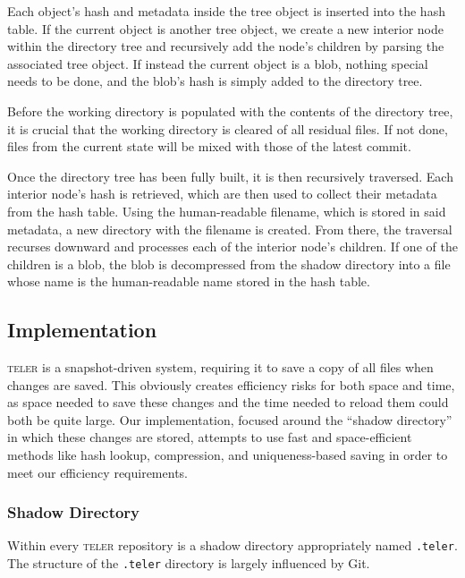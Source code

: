 \documentclass[12pt, letterpaper]{article}
\begin{document}
\begin{multicols}{2}
  Each object's hash and metadata inside the tree object is inserted
  into the hash table. If the current object is another tree object, we
  create a new interior node within the directory tree and recursively
  add the node's children by parsing the associated tree object. If
  instead the current object is a blob, nothing special needs to
  be done, and the blob's hash is simply added to the directory tree.

  Before the working directory is populated with the contents of the
  directory tree, it is crucial that the working directory is cleared
  of all residual files. If not done, files from the current state
  will be mixed with those of the latest commit.

  Once the directory tree has been fully built, it is then recursively
  traversed. Each interior node's hash is retrieved, which are
  then used to collect their metadata from the hash table. Using the
  human-readable filename, which is stored in said metadata, a new
  directory with the filename is created. From there, the traversal
  recurses downward and processes each of the interior node's
  children. If one of the children is a blob, the blob is decompressed
  from the shadow directory into a file whose name is the
  human-readable name stored in the hash table.

  \subsection{Implementation}
  \label{sec:implementation}
  \textsc{teler} is a snapshot-driven system, requiring it to save a copy of all
  files when changes are saved. This obviously creates efficiency risks for both
  space and time, as space needed to save these changes and the time needed to
  reload them could both be quite large. Our implementation, focused around the
  ``shadow directory'' in which these changes are stored, attempts to use
  fast and space-efficient methods like hash lookup, compression, and
  uniqueness-based saving in order to meet our efficiency requirements.

  \subsubsection{Shadow Directory}
  \label{subsubsec:shadowdir}
  Within every \textsc{teler} repository is a shadow directory
  appropriately named \texttt{.teler}. The structure of the
  \texttt{.teler} directory is largely influenced by Git.


\end{multicols}
\end{document}
